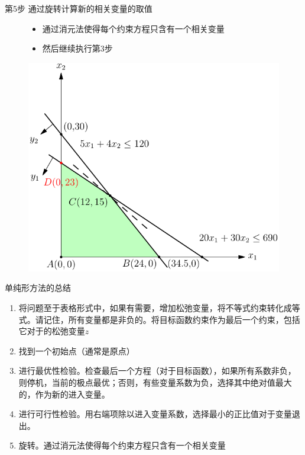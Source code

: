 \documentclass[mathserif, table]{beamer}
\begin{document}
\begin{frame}{第5步 通过旋转计算新的相关变量的取值}
  \begin{figure}
    \begin{minipage}{.5\linewidth}
      \begin{itemize}
      \item 通过消元法使得每个约束方程只含有一个相关变量
      \item 然后继续执行第3步
      \end{itemize}
    \end{minipage}%
    \begin{minipage}{.5\linewidth}
      \includegraphics[width=\textwidth{}]{simplex-rotate.pdf}
    \end{minipage}
  \end{figure}  
\end{frame}

\begin{frame}{单纯形方法的总结}
  \begin{enumerate}
  \item 将问题至于表格形式中，如果有需要，增加松弛变量，将不等式约束转化成等式。请记住，所有变量都是非负的。将目标函数约束作为最后一个约束，包括它对于的松弛变量$z$
  \item 找到一个初始点（通常是原点）
  \item 进行最优性检验。检查最后一个方程（对于目标函数），如果所有系数非负，则停机，当前的极点最优；否则，有些变量系数为负，选择其中绝对值最大的，作为新的进入变量。
  \item 进行可行性检验。用右端项除以进入变量系数，选择最小的正比值对于变量退出。
  \item 旋转。通过消元法使得每个约束方程只含有一个相关变量
  \end{enumerate}
\end{frame}
\end{document}
